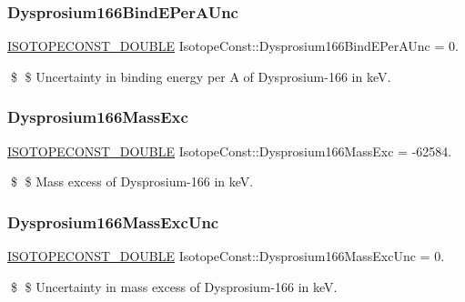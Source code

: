 \subsubsection{\texorpdfstring{Dysprosium166\+Bind\+E\+Per\+A\+Unc}{Dysprosium166BindEPerAUnc}}
{\footnotesize\ttfamily \mbox{\hyperlink{group___isotope_const-_macros_ga8f45a7272ce02c0b4c65c44636ed719a}{I\+S\+O\+T\+O\+P\+E\+C\+O\+N\+S\+T\+\_\+\+D\+O\+U\+B\+LE}} Isotope\+Const\+::\+Dysprosium166\+Bind\+E\+Per\+A\+Unc = 0.}

\$ \$ Uncertainty in binding energy per A of Dysprosium-\/166 in keV. \mbox{\label{group___isotope_const-_dysprosium-_dy166_ga889d6707cf0021d2e6e4bfe7f60dcc26}} 
\subsubsection{\texorpdfstring{Dysprosium166\+Mass\+Exc}{Dysprosium166MassExc}}
{\footnotesize\ttfamily \mbox{\hyperlink{group___isotope_const-_macros_ga8f45a7272ce02c0b4c65c44636ed719a}{I\+S\+O\+T\+O\+P\+E\+C\+O\+N\+S\+T\+\_\+\+D\+O\+U\+B\+LE}} Isotope\+Const\+::\+Dysprosium166\+Mass\+Exc = -\/62584.}

\$ \$ Mass excess of Dysprosium-\/166 in keV. \mbox{\label{group___isotope_const-_dysprosium-_dy166_ga6e9a49b70a8284194898ab749fd31a63}} 
\subsubsection{\texorpdfstring{Dysprosium166\+Mass\+Exc\+Unc}{Dysprosium166MassExcUnc}}
{\footnotesize\ttfamily \mbox{\hyperlink{group___isotope_const-_macros_ga8f45a7272ce02c0b4c65c44636ed719a}{I\+S\+O\+T\+O\+P\+E\+C\+O\+N\+S\+T\+\_\+\+D\+O\+U\+B\+LE}} Isotope\+Const\+::\+Dysprosium166\+Mass\+Exc\+Unc = 0.}

\$ \$ Uncertainty in mass excess of Dysprosium-\/166 in keV. \mbox{\label{group___isotope_const-_dysprosium-_dy166_gab0386f85b496540989c46594e8d2a297}} 
